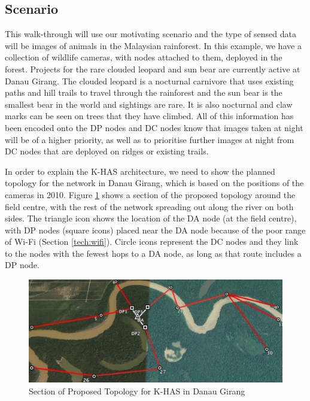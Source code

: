 		\subsection{Scenario}\label{arch:scen}
			This walk-through will use our motivating scenario and the type of sensed data will be images of animals in the Malaysian rainforest. In this example, we have a collection of wildlife cameras, with nodes attached to them, deployed in the forest. Projects for the rare clouded leopard and sun bear are currently active at Danau Girang. The clouded leopard is a nocturnal carnivore that uses existing paths and hill trails to travel through the rainforest and the sun bear is the smallest bear in the world and sightings are rare. It is also nocturnal and claw marks can be seen on trees that they have climbed. All of this information has been encoded onto the DP nodes and DC nodes know that images taken at night will be of a higher priority, as well as to prioritise further images at night from DC nodes that are deployed on ridges or existing trails.

			In order to explain the K-HAS architecture, we need to show the planned topology for the network in Danau Girang, which is based on the positions of the cameras in 2010. Figure \ref{topol} shows a section of the proposed topology around the field centre, with the rest of the network spreading out along the river on both sides. The triangle icon shows the location of the DA node (at the field centre), with DP nodes (square icons) placed near the DA node because of the poor range of Wi-Fi (Section \ref{tech:wifi}). Circle icons represent the DC nodes and they link to the nodes with the fewest hops to a DA node, as long as that route includes a DP node. 

			\begin{figure}[!t]
			\centering
			\includegraphics[width=\textwidth]{Chap4/figures/topology}
			\caption{Section of Proposed Topology for K-HAS in Danau Girang}
			\label{topol}
			\end{figure}
			
